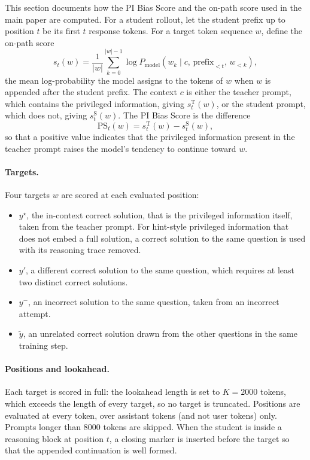 \documentclass{article}
\newcommand{\ysol}{y^{\star}}               %
\newcommand{\yalt}{y'}                        %
\newcommand{\ywrong}{y^{-}}                  %
\newcommand{\yother}{\tilde{y}}              %
\newcommand{\sstud}{s^{\mathrm{S}}}          %
\newcommand{\steach}{s^{\mathrm{T}}}         %
\newcommand{\pibias}{\mathrm{PS}}            %
\begin{document}
This section documents how the PI Bias Score and the on-path score used in the
main paper are computed. For a student rollout, let the student prefix up to
position $t$ be its first $t$ response tokens. For a target token sequence $w$,
define the on-path score
\begin{equation}
s_t(w) = \frac{1}{|w|}\sum_{k=0}^{|w|-1}
\log P_{\text{model}}\!\left(w_k \mid c,\, \text{prefix}_{<t},\, w_{<k}\right),
\end{equation}
the mean log-probability the model assigns to the tokens of $w$ when $w$ is
appended after the student prefix. The context $c$ is either the teacher prompt,
which contains the privileged information, giving $\steach_t(w)$, or the student
prompt, which does not, giving $\sstud_t(w)$. The PI Bias Score is the difference
\begin{equation}
\pibias_t(w) = \steach_t(w) - \sstud_t(w),
\end{equation}
so that a positive value indicates that the privileged information present in the
teacher prompt raises the model's tendency to continue toward $w$.

\paragraph{Targets.}
Four targets $w$ are scored at each evaluated position:
\begin{itemize}
\item $\ysol$, the in-context correct solution, that is the privileged
  information itself, taken from the teacher prompt. For hint-style privileged
  information that does not embed a full solution, a correct solution to the same
  question is used with its reasoning trace removed.
\item $\yalt$, a different correct solution to the same question, which requires
  at least two distinct correct solutions.
\item $\ywrong$, an incorrect solution to the same question, taken from an
  incorrect attempt.
\item $\yother$, an unrelated correct solution drawn from the other questions in
  the same training step.
\end{itemize}

\paragraph{Positions and lookahead.}
Each target is scored in full: the lookahead length is set to $K = 2000$ tokens,
which exceeds the length of every target, so no target is truncated. Positions
are evaluated at every token, over assistant tokens (and not user tokens) only. Prompts longer than
8000 tokens are skipped. When the student is inside a reasoning block at position
$t$, a closing marker is inserted before the target so that the appended
continuation is well formed.
\end{document}

